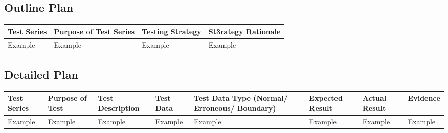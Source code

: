 \begin{landscape}
\subsection{Outline Plan}

\begin{center}
    \begin{tabular}{|p{2cm}|p{5cm}|p{5cm}|p{4cm}|}
        \hline
        \textbf{Test Series} & \textbf{Purpose of Test Series} & \textbf{Testing Strategy} & \textbf{St3rategy Rationale}\\ \hline
        Example & Example & Example & Example \\ \hline
    \end{tabular}
\end{center}

\subsection{Detailed Plan}

\begin{center}
    \begin{longtable}{|p{1.5cm}|p{2.5cm}|p{2.5cm}|p{2cm}|p{2cm}|p{2cm}|p{2cm}|p{2cm}|}
        \hline
        \textbf{Test Series} & \textbf{Purpose of Test} & \textbf{Test Description} & \textbf{Test Data} & \textbf{Test Data Type (Normal/ Erroneous/ Boundary)} & \textbf{Expected Result} & \textbf{Actual Result} & \textbf{Evidence}\\ \hline
        Example & Example & Example & Example & Example & Example & Example & Example \\ \hline
    \end{longtable}
\end{center}
\end{landscape}
